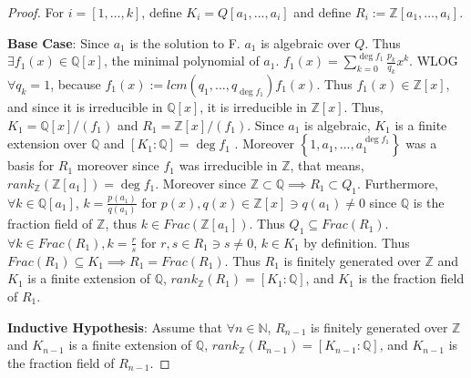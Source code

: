 \documentclass{article}
\newcommand{\Q}{\mathbb{Q}}
\newcommand{\Z}{\mathbb{Z}}
\newcommand{\N}{\mathbb{N}}
\begin{document}
\begin{proof} 
    For $i = [1, \dots, k]$, define $K_i = Q[a_1, ..., a_i]$ and define $R_i := \Z[a_1, \dots, a_i]$.  
    
    \textbf{Base Case}: Since $a_1$ is the solution to F. $a_1$ is algebraic over $Q$. Thus $\exists f_1(x) \in \Q[x]$, the minimal polynomial of $a_1$. $f_1(x) = \sum_{k = 0}^{\deg f_1} \frac{p_k}{q_k} x^k$. WLOG $\forall q_k = 1$, because $f_1(x) := lcm(q_1, ..., q_{\deg f_1}) f_1(x)$. Thus $f_1(x) \in \Z[x]$, and since it is irreducible in $\Q[x]$, it is irreducible in $\Z[x]$. Thus, $K_1 = \Q[x] / (f_1)$ and $R_1 = \Z[x] / (f_1)$. Since $a_1$ is algebraic, $K_1$ is a finite extension over $\Q$ and $[K_1 : \Q] = \deg f_1$ . Moreover $\left\{ 1, a_1, \dots, a_1^{\deg f_1} \right\}$ was a basis for $R_1$ moreover since $f_1$ was irreducible in $\Z$, that means, $rank_{\Z}(\Z[a_1]) = \deg f_1$. Moreover since $\Z \subset \Q \implies R_1 \subset Q_1$. Furthermore, $\forall k \in \Q[a_1]$, $k = \frac{p(a_1)}{q(a_1)}$ for $p(x), q(x) \in \Z[x] \ni q(a_1) \neq 0$ since $\Q$ is the fraction field of $\Z$, thus $k \in Frac(\Z[a_1])$. Thus $Q_1 \subseteq Frac(R_1)$. $\forall k \in Frac(R_1), k = \frac{r}{s}$ for $r, s \in R_1 \ni s \neq 0$, $k \in K_1$ by definition. Thus $Frac(R_1) \subseteq K_1 \implies R_1 = Frac(R_1)$. Thus $R_1$ is finitely generated over $\Z$ and $K_1$ is a finite extension of $\Q$, $rank_{\Z}(R_1) = [K_1 : \Q]$, and $K_1$ is the fraction field of $R_1$. 
    
    \textbf{Inductive Hypothesis}: Assume that $\forall n \in \N$,  $R_{n - 1}$ is finitely generated over $\Z$ and $K_{n - 1}$ is a finite extension of $\Q$, $rank_{\Z}(R_{n - 1}) = [K_{n - 1} : \Q]$, and $K_{n - 1}$ is the fraction field of $R_{n - 1}$.
    

\end{proof}
\end{document}
